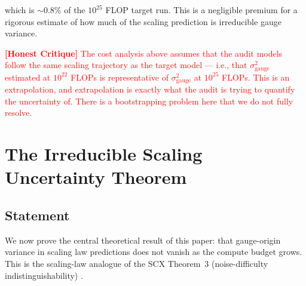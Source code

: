 \documentclass[12pt,a4paper]{article}
\theoremstyle{remark}
\newcommand{\honestcrit}[1]{\textcolor{red}{\textbf{[Honest Critique]} #1}}
\begin{document}
which is $\sim 0.8\%$ of the $10^{25}$ FLOP target run. This is a negligible premium for a rigorous estimate of how much of the scaling prediction is irreducible gauge variance.

\honestcrit{The cost analysis above assumes that the audit models follow the same scaling trajectory as the target model — i.e., that $\sigma^2_{\text{gauge}}$ estimated at $10^{22}$ FLOPs is representative of $\sigma^2_{\text{gauge}}$ at $10^{25}$ FLOPs. This is an extrapolation, and extrapolation is exactly what the audit is trying to quantify the uncertainty of. There is a bootstrapping problem here that we do not fully resolve.}

\section{The Irreducible Scaling Uncertainty Theorem}
\label{sec:theorem}

\subsection{Statement}

We now prove the central theoretical result of this paper: that gauge-origin variance in scaling law predictions does not vanish as the compute budget grows. This is the scaling-law analogue of the SCX Theorem~3 (noise-difficulty indistinguishability) \cite{scx2026}.
\end{document}
